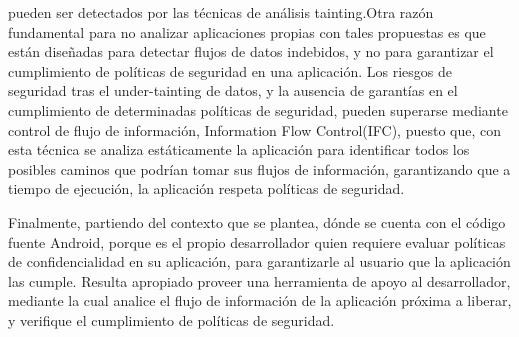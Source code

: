 pueden ser detectados por las técnicas de análisis tainting.\newline Otra razón
fundamental para no  analizar aplicaciones propias con tales propuestas es que
están diseñadas para detectar flujos de datos indebidos, y no para garantizar el
cumplimiento de políticas de seguridad en una aplicación.\newline 
Los riesgos de seguridad tras el under-tainting de datos, y la ausencia de
garantías en el cumplimiento de determinadas políticas de seguridad, pueden
superarse mediante control de flujo de información, Information Flow
Control(IFC), puesto que, con esta técnica se analiza estáticamente la
aplicación para identificar todos los posibles caminos que podrían tomar sus
flujos de información, garantizando que a tiempo de ejecución, la
aplicación respeta políticas de seguridad.\newline

Finalmente, partiendo del contexto que se plantea, dónde se cuenta con el código
fuente Android, porque es el propio desarrollador quien requiere evaluar
políticas de confidencialidad en su aplicación, para  garantizarle
al usuario que la aplicación las cumple. Resulta apropiado proveer una
herramienta de apoyo al desarrollador, mediante la cual analice el flujo de
información de la aplicación próxima a liberar, y verifique el cumplimiento de
políticas de seguridad.
 














